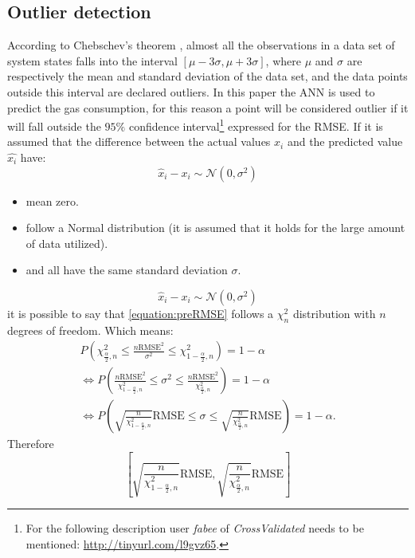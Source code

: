 \documentclass{sig-alternate-sigmod07}
\begin{document}
\subsection{Outlier detection}

According to Chebschev's theorem \cite{amidan2005data}, almost all the observations in a data set of system states falls into the interval $[\mu - 3\sigma, \mu+3\sigma]$, where $\mu$ and $\sigma$ are respectively the mean and standard deviation of the data set, and the data points outside this interval are declared outliers. In this paper the ANN is used to predict the gas consumption, for this reason a point will be considered outlier if it will fall outside the $95\%$ confidence interval\footnote{For the following description user \textit{fabee} of \emph{CrossValidated} needs to be mentioned: \url{http://tinyurl.com/l9gvz65}. } expressed for the RMSE. If it is assumed that the difference between the actual values $x_i$ and the predicted value $\hat{x_i}$ have:
\begin{equation}
\hat{x}_{i}-x_{i}	\sim	\mathcal{N}\left(0,\sigma^{2}\right)
\end{equation}
\begin{itemize}
\itemsep0em
  \item mean zero.
  \item follow a Normal distribution (it is assumed that it holds for the large amount of data utilized).
  \item and all have the same standard deviation $\sigma$.
\end{itemize}
\begin{equation}
\label{equation:preRMSE}
\hat{x}_{i}-x_{i}	\sim	\mathcal{N}\left(0,\sigma^{2}\right)
\end{equation}
it is possible to say that \cref{equation:preRMSE} follows a $\chi_{n}^{2}$ distribution with $n$ degrees of freedom. Which means:
\begin{align}
P\left(\chi_{\frac{\alpha}{2},n}^{2}\le\frac{n\mbox{RMSE}^{2}}{\sigma^{2}}\le\chi_{1-\frac{\alpha}{2},n}^{2}\right)	=	1-\alpha\\
\Leftrightarrow P\left(\frac{n\mbox{RMSE}^{2}}{\chi_{1-\frac{\alpha}{2},n}^{2}}\le\sigma^{2}\le\frac{n\mbox{RMSE}^{2}}{\chi_{\frac{\alpha}{2},n}^{2}}\right)	=	1-\alpha\\
\Leftrightarrow P\left(\sqrt{\frac{n}{\chi_{1-\frac{\alpha}{2},n}^{2}}}\mbox{RMSE}\le\sigma\le\sqrt{\frac{n}{\chi_{\frac{\alpha}{2},n}^{2}}}\mbox{RMSE}\right)	=	1-\alpha.
\end{align}
Therefore
\begin{equation}
\left[\sqrt{\frac{n}{\chi_{1-\frac{\alpha}{2},n}^{2}}}\mbox{RMSE},\sqrt{\frac{n}{\chi_{\frac{\alpha}{2},n}^{2}}}\mbox{RMSE}\right]
\end{equation}
\end{document}
